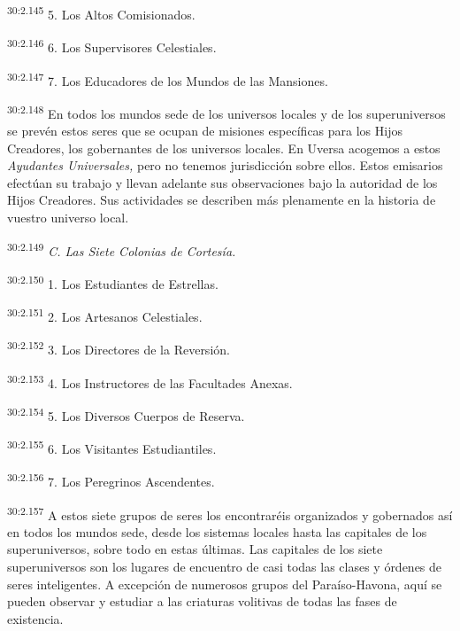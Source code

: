 \par
\textsuperscript{30:2.145} 5. Los Altos Comisionados.

\par
\textsuperscript{30:2.146} 6. Los Supervisores Celestiales.

\par
\textsuperscript{30:2.147} 7. Los Educadores de los Mundos de las Mansiones.

\par
\textsuperscript{30:2.148} En todos los mundos sede de los universos locales y de los superuniversos se prevén estos seres que se ocupan de misiones específicas para los Hijos Creadores, los gobernantes de los universos locales. En Uversa acogemos a estos \textit{Ayudantes Universales,} pero no tenemos jurisdicción sobre ellos. Estos emisarios efectúan su trabajo y llevan adelante sus observaciones bajo la autoridad de los Hijos Creadores. Sus actividades se describen más plenamente en la historia de vuestro universo local.

\par
\textsuperscript{30:2.149} \textit{C. Las Siete Colonias de Cortesía.}

\par
\textsuperscript{30:2.150} 1. Los Estudiantes de Estrellas.

\par
\textsuperscript{30:2.151} 2. Los Artesanos Celestiales.

\par
\textsuperscript{30:2.152} 3. Los Directores de la Reversión.

\par
\textsuperscript{30:2.153} 4. Los Instructores de las Facultades Anexas.

\par
\textsuperscript{30:2.154} 5. Los Diversos Cuerpos de Reserva.

\par
\textsuperscript{30:2.155} 6. Los Visitantes Estudiantiles.

\par
\textsuperscript{30:2.156} 7. Los Peregrinos Ascendentes.

\par
\textsuperscript{30:2.157} A estos siete grupos de seres los encontraréis organizados y gobernados así en todos los mundos sede, desde los sistemas locales hasta las capitales de los superuniversos, sobre todo en estas últimas. Las capitales de los siete superuniversos son los lugares de encuentro de casi todas las clases y órdenes de seres inteligentes. A excepción de numerosos grupos del Paraíso-Havona, aquí se pueden observar y estudiar a las criaturas volitivas de todas las fases de existencia.

